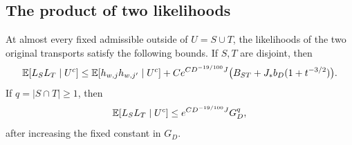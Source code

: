 \subsection{The product of two likelihoods}

\begin{lemma}\label{long:product}
At almost every fixed admissible outside of $U=S\cup T$, the likelihoods
of the two original transports satisfy the following bounds.  If $S,T$
are disjoint, then
\begin{equation}\label{long:disjoint-product}
 \mathbb E[L_SL_T\mid U^c]\le
 \mathbb E[h_{w,j}h_{w,j'}\mid U^c]
 +C e^{C D^{-19/100}J}
          \bigl(B_{ST}+J_*b_D(1+t^{-3/2})\bigr).
\end{equation}
If $q=|S\cap T|\ge1$, then
\begin{equation}\label{long:shared-product}
          \mathbb E[L_SL_T\mid U^c]
                     \le e^{C D^{-19/100}J}G_D^q,
\end{equation}
after increasing the fixed constant in $G_D$.
\end{lemma}
